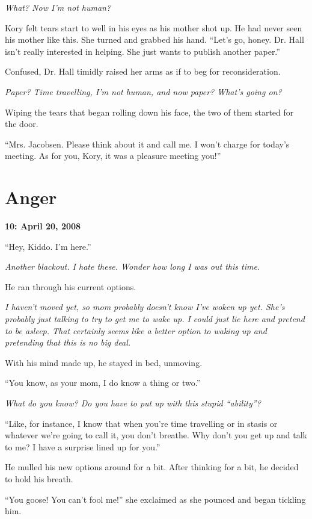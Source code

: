 \documentclass[9pt]{memoir}
\newcommand{\storydate}[1]{\noindent \textbf{#1} \vspace{2em}}
\begin{document}
\textit{What? Now I'm not human?}

Kory felt tears start to well in his eyes as his mother shot up. He had never seen his mother like this. She turned and grabbed his hand. ``Let's go, honey. Dr. Hall isn't really interested in helping. She just wants to publish another paper.''

Confused, Dr. Hall timidly raised her arms as if to beg for reconsideration.

\textit{Paper? Time travelling, I'm not human, and now paper? What's going on?}

Wiping the tears that began rolling down his face, the two of them started for the door.

``Mrs. Jacobsen. Please think about it and call me. I won't charge for today's meeting. As for you, Kory, it was a pleasure meeting you!''


\chapter*{Anger}

\storydate{10: April 20, 2008}

``Hey, Kiddo. I'm here.''

\textit{Another blackout. I hate these. Wonder how long I was out this time.}

He ran through his current options.

\textit{I haven't moved yet, so mom probably doesn't know I've woken up yet. She's probably just talking to try to get me to wake up. I could just lie here and pretend to be asleep. That certainly seems like a better option to waking up and pretending that this is no big deal.}

With his mind made up, he stayed in bed, unmoving.

``You know, as your mom, I do know a thing or two.''

\textit{What do you know? Do you have to put up with this stupid ``ability''?}

``Like, for instance, I know that when you're time travelling or in stasis or whatever we're going to call it, you don't breathe. Why don't you get up and talk to me? I have a surprise lined up for you.''

He mulled his new options around for a bit. After thinking for a bit, he decided to hold his breath.

``You goose! You can't fool me!'' she exclaimed as she pounced and began tickling him.
\end{document}
